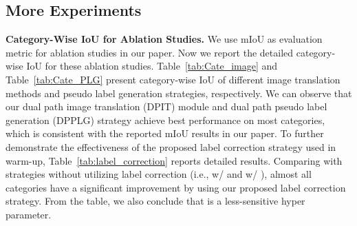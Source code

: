 \documentclass[10pt,twocolumn,letterpaper]{article}
\begin{document}
{\small


}
\cleardoublepage
\onecolumn
\renewcommand\thesubsection{Appendix \Alph{subsection}}

\subsection{More Experiments}


{\noindent \textbf{Category-Wise IoU for Ablation Studies.}}\hspace{3pt}
We use mIoU as evaluation metric for ablation studies in our paper. Now we report the detailed category-wise IoU for these ablation studies. Table~\ref{tab:Cate_image} and Table~\ref{tab:Cate_PLG} present category-wise IoU of different image translation methods and pseudo label generation strategies, respectively. We can observe that our dual path image translation (DPIT) module and dual path pseudo label generation (DPPLG) strategy achieve best performance on most categories, which is consistent with the reported mIoU results in our paper. To further demonstrate the effectiveness of the proposed label correction strategy used in  warm-up, Table~\ref{tab:label_correction} reports detailed results. Comparing with strategies without utilizing label correction (i.e.,  w/  and  w/ ), almost all categories have a significant improvement by using our proposed label correction strategy. From the table, we also conclude that  is a less-sensitive hyper parameter.
\end{document}
